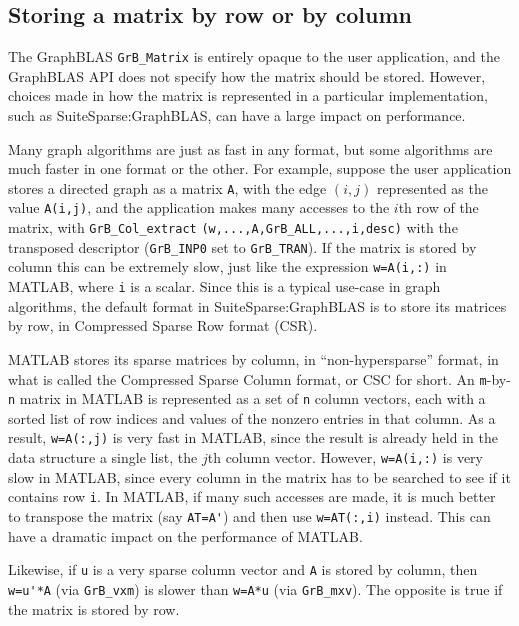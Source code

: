 \documentclass[12pt]{article}
\begin{document}
{%
\subsection{Storing a matrix by row or by column}

The GraphBLAS \verb'GrB_Matrix' is entirely opaque to the user application, and
the GraphBLAS API does not specify how the matrix should be stored.  However,
choices made in how the matrix is represented in a particular implementation,
such as SuiteSparse:GraphBLAS, can have a large impact on performance.

Many graph algorithms are just as fast in any format, but some algorithms are
much faster in one format or the other.  For example, suppose the user
application stores a directed graph as a matrix \verb'A', with the edge $(i,j)$
represented as the value \verb'A(i,j)', and the application makes many accesses
to the $i$th row of the matrix, with \verb'GrB_Col_extract'
\verb'(w,...,A,GrB_ALL,...,i,desc)' with the transposed descriptor
(\verb'GrB_INP0' set to \verb'GrB_TRAN').  If the matrix is stored by column
this can be extremely slow, just like the expression \verb'w=A(i,:)' in MATLAB,
where \verb'i' is a scalar.  Since this is a typical use-case in graph
algorithms, the default format in SuiteSparse:GraphBLAS is to store its
matrices by row, in Compressed Sparse Row format (CSR).

MATLAB stores its sparse matrices by column, in ``non-hypersparse'' format, in
what is called the Compressed Sparse Column format, or CSC for short.  An
\verb'm'-by-\verb'n' matrix in MATLAB is represented as a set of \verb'n'
column vectors, each with a sorted list of row indices and values of the
nonzero entries in that column.  As a result, \verb'w=A(:,j)' is very fast in
MATLAB, since the result is already held in the data structure a single list,
the $j$th column vector.  However, \verb'w=A(i,:)' is very slow in MATLAB,
since every column in the matrix has to be searched to see if it contains row
\verb'i'.  In MATLAB, if many such accesses are made, it is much better to
transpose the matrix (say \verb"AT=A'") and then use \verb"w=AT(:,i)" instead.
This can have a dramatic impact on the performance of MATLAB.

Likewise, if \verb'u' is a very sparse column vector and \verb'A' is stored by
column, then \verb"w=u'*A" (via \verb'GrB_vxm') is slower than \verb'w=A*u'
(via \verb'GrB_mxv').  The opposite is true if the matrix is stored by row.

}
\end{document}

